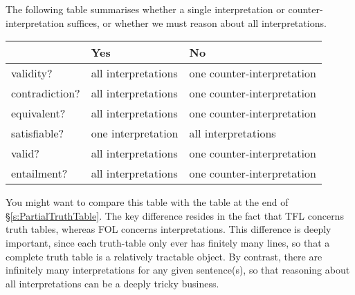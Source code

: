 The following table summarises whether a single interpretation or counter-interpretation suffices, or whether we must reason about all interpretations.

\begin{center}\small
\begin{tabular}{l l l}
 & \textbf{Yes} & \textbf{No}\\
 \hline
validity? & all interpretations & one counter-interpretation\\
contradiction? &  all interpretations  & one counter-interpretation\\
equivalent? & all interpretations & one counter-interpretation\\
satisfiable? & one interpretation & all interpretations\\
valid? & all interpretations & one counter-interpretation\\
entailment? & all interpretations & one counter-interpretation\\
\end{tabular}
\end{center}
\label{table.ModelOrArgument}

You might want to compare this table with the table at the end of \S\ref{s:PartialTruthTable}. The key difference resides in the fact that TFL concerns truth tables, whereas FOL concerns interpretations. This difference is deeply important, since each truth-table only ever has finitely many lines, so that a complete truth table is a relatively tractable object. By contrast, there are infinitely many interpretations for any given sentence(s), so that reasoning about all interpretations can be a deeply tricky business.
